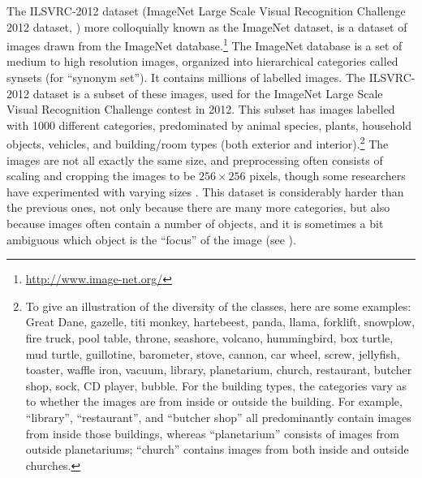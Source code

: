 The ILSVRC-2012 dataset
(ImageNet Large Scale Visual Recognition Challenge 2012 dataset, \textcite{Russakovsky2015})
more colloquially known as the ImageNet dataset,
is a dataset of images drawn from the ImageNet database.\footnote{
  \url{http://www.image-net.org/}}
The ImageNet database is a set of medium to high resolution images,
organized into hierarchical categories called synsets (for ``synonym set'').
It contains millions of labelled images.
The ILSVRC-2012 dataset is a subset of these images,
used for the ImageNet Large Scale Visual Recognition Challenge contest in 2012.
This subset has images labelled with 1000 different categories,
predominated by animal species, plants, household objects, vehicles,
and building/room types (both exterior and interior).\footnote{
  To give an illustration of the diversity of the classes,
  here are some examples:
  Great Dane, gazelle, titi monkey, hartebeest, panda, llama,
  forklift, snowplow, fire truck, pool table, throne, seashore, volcano,
  hummingbird, box turtle, mud turtle, guillotine, barometer, stove,
  cannon, car wheel, screw, jellyfish, toaster, waffle iron, vacuum,
  library, planetarium, church, restaurant, butcher shop, sock, CD player, bubble.
  For the building types, the categories vary as to whether the images
  are from inside or outside the building.
  For example, ``library'', ``restaurant'', and ``butcher shop'' all predominantly
  contain images from inside those buildings,
  whereas ``planetarium'' consists of images from outside planetariums;
  ``church'' contains images from both inside and outside churches.}
The images are not all exactly the same size,
and preprocessing often consists of scaling and cropping the images
to be $256 \times 256$ pixels,
though some researchers have experimented with varying sizes \parencite[\eg/][]{Simonyan2015}.
This dataset is considerably harder than the previous ones,
not only because there are many more categories,
but also because images often contain a number of objects,
and it is sometimes a bit ambiguous which object is the ``focus'' of the image
(see ).

